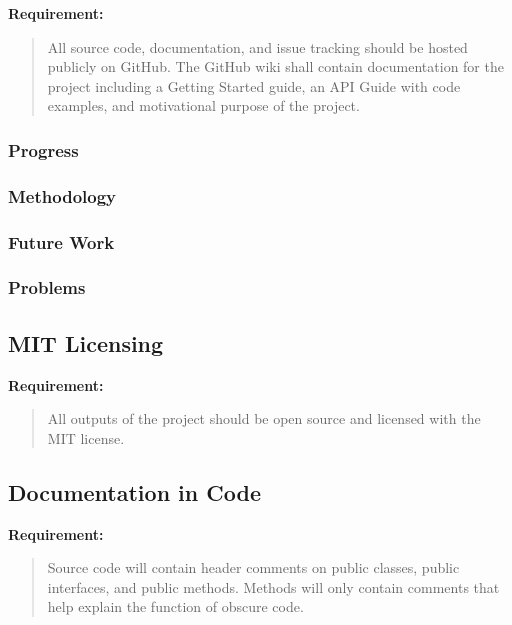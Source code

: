 \documentclass[draftclsnofoot,onecolumn]{IEEEtran}
\begin{document}
\textbf{Requirement:}

\begin{quote}

All source code, documentation, and issue tracking should be hosted publicly on GitHub. The GitHub wiki shall contain documentation for the project including a Getting Started guide, an API Guide with code examples, and motivational purpose of the project.

\end{quote}

\subsubsection{Progress}

\subsubsection{Methodology}

\subsubsection{Future Work}

\subsubsection{Problems}






\subsection{MIT Licensing}

\textbf{Requirement:}

\begin{quote}

All outputs of the project should be open source and licensed with the MIT license.

\end{quote}






\subsection{Documentation in Code}

\textbf{Requirement:}

\begin{quote}

Source code will contain header comments on public classes, public interfaces, and public methods. Methods will only contain comments that help explain the function of obscure code.

\end{quote}
\end{document}

